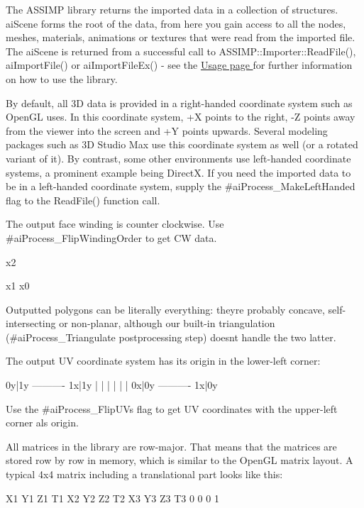 The A\+S\+S\+I\+M\+P library returns the imported data in a collection of structures. ai\+Scene forms the root of the data, from here you gain access to all the nodes, meshes, materials, animations or textures that were read from the imported file. The ai\+Scene is returned from a successful call to A\+S\+S\+I\+M\+P\+::\+Importer\+::\+Read\+File(), ai\+Import\+File() or ai\+Import\+File\+Ex() -\/ see the \hyperlink{usage}{Usage page } for further information on how to use the library.

By default, all 3\+D data is provided in a right-\/handed coordinate system such as Open\+G\+L uses. In this coordinate system, +\+X points to the right, -\/\+Z points away from the viewer into the screen and +\+Y points upwards. Several modeling packages such as 3\+D Studio Max use this coordinate system as well (or a rotated variant of it). By contrast, some other environments use left-\/handed coordinate systems, a prominent example being Direct\+X. If you need the imported data to be in a left-\/handed coordinate system, supply the \#ai\+Process\+\_\+\+Make\+Left\+Handed flag to the Read\+File() function call.

The output face winding is counter clockwise. Use \#ai\+Process\+\_\+\+Flip\+Winding\+Order to get C\+W data. 
\begin{DoxyCode}
x2
  
            x1
    x0
\end{DoxyCode}


Outputted polygons can be literally everything\+: they\textquotesingle{}re probably concave, self-\/intersecting or non-\/planar, although our built-\/in triangulation (\#ai\+Process\+\_\+\+Triangulate postprocessing step) doesn\textquotesingle{}t handle the two latter.

The output U\+V coordinate system has its origin in the lower-\/left corner\+: 
\begin{DoxyCode}
0y|1y ---------- 1x|1y 
 |                |
 |                |
 |                |
0x|0y ---------- 1x|0y
\end{DoxyCode}
 Use the \#ai\+Process\+\_\+\+Flip\+U\+Vs flag to get U\+V coordinates with the upper-\/left corner als origin.

All matrices in the library are row-\/major. That means that the matrices are stored row by row in memory, which is similar to the Open\+G\+L matrix layout. A typical 4x4 matrix including a translational part looks like this\+: 
\begin{DoxyCode}
X1  Y1  Z1  T1
X2  Y2  Z2  T2
X3  Y3  Z3  T3
0   0   0   1
\end{DoxyCode}


